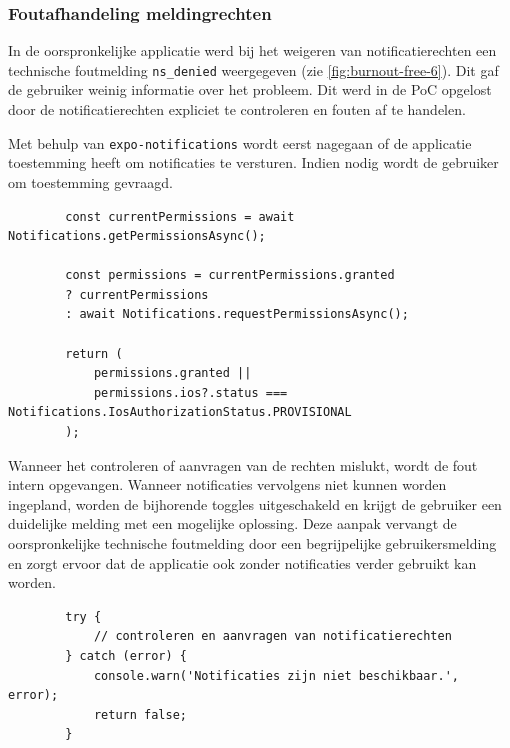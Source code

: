 \newpage

\subsubsection{Foutafhandeling meldingrechten}
\label{sec:foutafhandeling-code}

\vspace{1em}

In de oorspronkelijke applicatie werd bij het weigeren van notificatierechten een technische foutmelding \texttt{ns\_denied} weergegeven (zie \ref{fig:burnout-free-6}). Dit gaf de gebruiker weinig informatie over het probleem. Dit werd in de PoC opgelost door de notificatierechten expliciet te controleren en fouten af te handelen.

Met behulp van \texttt{expo-notifications} wordt eerst nagegaan of de applicatie toestemming heeft om notificaties te versturen. Indien nodig wordt de gebruiker om toestemming gevraagd. 

\begin{listing}[H]
    \begin{verbatim}
        const currentPermissions = await Notifications.getPermissionsAsync();
        
        const permissions = currentPermissions.granted
        ? currentPermissions
        : await Notifications.requestPermissionsAsync();
        
        return (
            permissions.granted ||
            permissions.ios?.status === Notifications.IosAuthorizationStatus.PROVISIONAL
        );
    \end{verbatim}
    \caption[Controleren en aanvragen van notificatierechten]
    {Controleren en indien nodig aanvragen van notificatierechten voor notificaties.}
    \label{lst:melding-toestemming}
\end{listing}

Wanneer het controleren of aanvragen van de rechten mislukt, wordt de fout intern opgevangen. Wanneer notificaties vervolgens niet kunnen worden ingepland, worden de bijhorende toggles uitgeschakeld en krijgt de gebruiker een duidelijke melding met een mogelijke oplossing. Deze aanpak vervangt de oorspronkelijke technische foutmelding door een begrijpelijke gebruikersmelding en zorgt ervoor dat de applicatie ook zonder notificaties verder gebruikt kan worden.

\begin{listing}[H]
    \begin{verbatim}
        try {
            // controleren en aanvragen van notificatierechten
        } catch (error) {
            console.warn('Notificaties zijn niet beschikbaar.', error);
            return false;
        }
    \end{verbatim}
    \caption[Afhandelen van fouten bij notificatierechten]
    {Intern opvangen van fouten bij het controleren of aanvragen van notificatierechten.}
    \label{lst:melding-error}
\end{listing}

